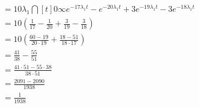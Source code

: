 \documentclass[dvipdfmx,titlepage, 11pt, a4paper]{jsarticle}%
\begin{document}
\begin{enumerate}[(1)]
\begin{align*}
            &= 10\lambda_1 \dint[t]{0}{\infty}{e^{-17\lambda_1 t} - e^{-20\lambda_1 t} + 3e^{-19\lambda_1 t} - 3e^{-18\lambda_1 t}}\\
            &= 10\left(\frac{1}{17} - \frac{1}{20} + \frac{3}{19} - \frac{3}{18}\right)\\
            &= 10\left(\frac{60 - 19}{20\cdot 19} + \frac{18 - 51}{18\cdot 17}\right)\\
            &= \frac{41}{38} - \frac{55}{51}\\
            &= \frac{41\cdot 51 - 55\cdot 38}{38 \cdot 51}\\
            &= \frac{2091 - 2090}{1938}\\
            &= \frac{1}{1938}\\
        \end{align*}
\end{enumerate}
{}
\end{document}
